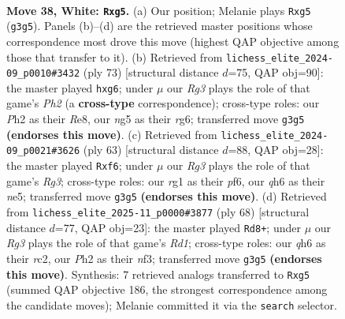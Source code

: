\documentclass[11pt]{article}
\begin{document}
\clearpage

\begin{figure}[p]\centering
\begin{subfigure}{0.46\textwidth}\centering
\resizebox{\linewidth}{!}{%
\newchessgame
\chessboard[
  setfen={7k/p2p4/2p2p1q/6n1/1P1P3Q/6RK/5P1P/6r1 w - - 8 38},
  showmover=false,
  pgfstyle=straightmove, color=movearrow, markmove={g3-g5}
]}
\caption{}
\end{subfigure}\hfill
\begin{subfigure}{0.46\textwidth}\centering
\resizebox{\linewidth}{!}{%
\newchessgame
\chessboard[
  setfen={4r1k1/5q1p/6R1/p2p3Q/P4P2/4P3/4NK1P/8 b - - 0 37},
  showmover=false,
  pgfstyle=straightmove, color=movearrow, markmove={h7-g6}
]}
\caption{}
\end{subfigure}
\\[4pt]
\begin{subfigure}{0.46\textwidth}\centering
\resizebox{\linewidth}{!}{%
\newchessgame
\chessboard[
  setfen={6k1/5p2/p4Pr1/3QN1qp/3B1R2/6P1/P1P4P/4K3 b - - 0 32},
  showmover=false,
  pgfstyle=straightmove, color=movearrow, markmove={g6-f6}
]}
\caption{}
\end{subfigure}\hfill
\begin{subfigure}{0.46\textwidth}\centering
\resizebox{\linewidth}{!}{%
\newchessgame
\chessboard[
  setfen={2q3k1/5pp1/8/5P2/1P2p1P1/4PnB1/P1r1Q1K1/3R4 w - - 1 35},
  showmover=false,
  pgfstyle=straightmove, color=movearrow, markmove={d1-d8}
]}
\caption{}
\end{subfigure}
\caption{\textbf{Move 38, White: \texttt{Rxg5}.} (a) Our position; Melanie plays \texttt{Rxg5} (\texttt{g3g5}). Panels (b)--(d) are the retrieved master positions whose correspondence most drove this move (highest QAP objective among those that transfer to it). (b) Retrieved from \texttt{lichess\_elite\_2024-09\_p0010\#3432} (ply 73) [structural distance $d$=75, QAP obj=90]: the master played \texttt{hxg6}; under $\mu$ our \emph{Rg3} plays the role of that game's \emph{Ph2} (a \textbf{cross-type} correspondence); cross-type roles: our \emph{P}h2 as their \emph{R}e8, our \emph{n}g5 as their \emph{r}g6; transferred move \texttt{g3g5} \textbf{(endorses this move)}. (c) Retrieved from \texttt{lichess\_elite\_2024-09\_p0021\#3626} (ply 63) [structural distance $d$=88, QAP obj=28]: the master played \texttt{Rxf6}; under $\mu$ our \emph{Rg3} plays the role of that game's \emph{Rg3}; cross-type roles: our \emph{r}g1 as their \emph{p}f6, our \emph{q}h6 as their \emph{n}e5; transferred move \texttt{g3g5} \textbf{(endorses this move)}. (d) Retrieved from \texttt{lichess\_elite\_2025-11\_p0000\#3877} (ply 68) [structural distance $d$=77, QAP obj=23]: the master played \texttt{Rd8+}; under $\mu$ our \emph{Rg3} plays the role of that game's \emph{Rd1}; cross-type roles: our \emph{q}h6 as their \emph{r}c2, our \emph{P}h2 as their \emph{n}f3; transferred move \texttt{g3g5} \textbf{(endorses this move)}. Synthesis: 7 retrieved analogs transferred to \texttt{Rxg5} (summed QAP objective 186, the strongest correspondence among the candidate moves); Melanie committed it via the \texttt{search} selector.}
\label{fig:thought-m74}
\end{figure}
\end{document}
